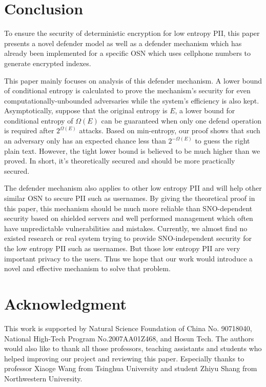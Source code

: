 \documentclass[10pt, conference, compsocconf]{IEEEtran}
\begin{document}
\section{Conclusion}\label{sec_cl}
    To ensure the security of deterministic encryption
    for low entropy PII,
    this paper presents a novel defender model as well
    as a defender mechanism which has already been implemented
    for a specific
    OSN which uses cellphone numbers to generate encrypted indexes.

    This paper mainly focuses on analysis of this defender mechanism.
    A lower bound of conditional entropy is calculated to
    prove the mechanism's security for even
    computationally-unbounded adversaries while
    the system's efficiency is also kept.
    Asymptotically, suppose that the original entropy is $E$,
    a lower bound for conditional entropy of $\Omega(E)$ can be
    guaranteed when only one defend operation is required after
    $2^{\Omega(E)}$ attacks.
    Based on min-entropy, our proof shows that
    such an adversary only has an expected chance
    less than $2^{-\Omega(E)}$ to guess the right plain text.
    However, the tight lower bound
    is believed to be much higher than we proved.
    In short, it's theoretically secured and should be more practically secured.

    The defender mechanism also applies to other low entropy
    PII and will help other similar OSN to secure PII such
    as usernames. 
    By giving the theoretical proof
    in this paper, this mechanism should be much more reliable than SNO-dependent security based on
    shielded servers and well performed management which often have unpredictable
    vulnerabilities and mistakes.
    Currently, we almost find no existed research or real system
    trying to provide SNO-independent security for the low entropy PII such as usernames. 
    But those low entropy PII are very important privacy to the users.
    Thus we hope that our work would introduce a novel and effective mechanism to
    solve that problem.



\section*{Acknowledgment}
This work is supported by Natural Science Foundation of China No. 90718040, National High-Tech Program No.2007AA01Z468,
and Hosun Tech.
The authors would also like to thank all those professors, teaching assistants and students
who helped improving our project and reviewing this paper. Especially thanks to professor
Xiaoge Wang from Tsinghua University and student Zhiyu Shang from Northwestern University.
\end{document}
